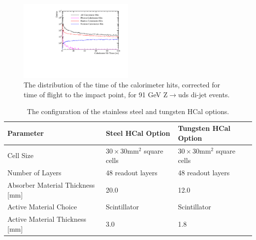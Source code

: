 \begin{figure}
\centering
\includegraphics[width=0.5\textwidth]{OptimisationStudies/Plots/Description/CalorimeterHitTimes_91GeV_Z_uds_Steel.pdf}
\caption[The distribution of the time of the calorimeter hits, corrected for time of flight to the impact point, for 91 GeV Z$\rightarrow$uds di-jet events.]{The distribution of the time of the calorimeter hits, corrected for time of flight to the impact point, for 91 GeV Z$\rightarrow$uds di-jet events.}
\label{fig:calohittiming}
\end{figure} 

\begin{table}[h!]
\centering
\begin{tabular}{ l l l }
\hline
Parameter & Steel HCal Option & Tungsten HCal Option \\
\hline
Cell Size & $30 \times 30 \text{mm}^{2}$ square cells & $30 \times 30 \text{mm}^{2}$ square cells\\
Number of Layers & 48 readout layers & 48 readout layers\\
Absorber Material Thickness [mm] & 20.0 & 12.0 \\
Active Material Choice & Scintillator & Scintillator \\
Active Material Thickness [mm] & 3.0 & 1.8 \\
\hline
\end{tabular}
\caption[The configuration of the stainless steel and tungsten HCal options.]{The configuration of the stainless steel and tungsten HCal options.}
\label{table:hcalabsmaterial}
\end{table}

